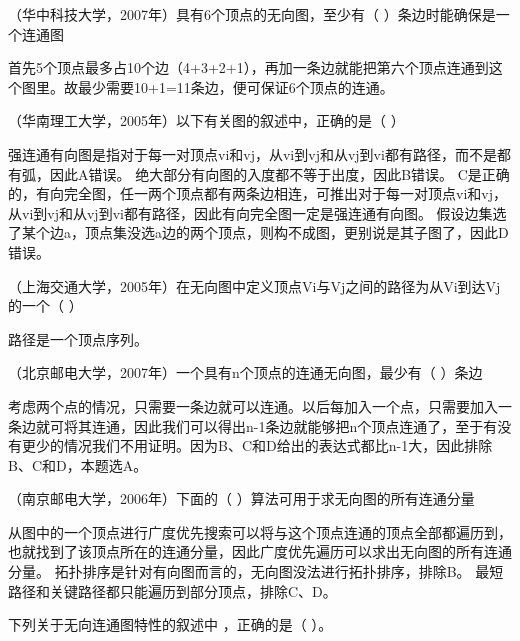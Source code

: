 \question （华中科技大学，2007年）具有6个顶点的无向图，至少有（
）条边时能确保是一个连通图
\par{}
\begin{solution}首先5个顶点最多占10个边（4+3+2+1），再加一条边就能把第六个顶点连通到这个图里。故最少需要10+1=11条边，便可保证6个顶点的连通。
\end{solution}
\question （华南理工大学，2005年）以下有关图的叙述中，正确的是（ ）
\par{}
\begin{solution}强连通有向图是指对于每一对顶点vi和vj，从vi到vj和从vj到vi都有路径，而不是都有弧，因此A错误。
绝大部分有向图的入度都不等于出度，因此B错误。
C是正确的，有向完全图，任一两个顶点都有两条边相连，可推出对于每一对顶点vi和vj，从vi到vj和从vj到vi都有路径，因此有向完全图一定是强连通有向图。
假设边集选了某个边a，顶点集没选a边的两个顶点，则构不成图，更别说是其子图了，因此D错误。
\end{solution}
\question （上海交通大学，2005年）在无向图中定义顶点Vi与Vj之间的路径为从Vi到达Vj的一个（
）
\par{}
\begin{solution}路径是一个顶点序列。
\end{solution}
\question （北京邮电大学，2007年）一个具有n个顶点的连通无向图，最少有（ ）条边
\par{}
\begin{solution}考虑两个点的情况，只需要一条边就可以连通。以后每加入一个点，只需要加入一条边就可将其连通，因此我们可以得出n-1条边就能够把n个顶点连通了，至于有没有更少的情况我们不用证明。因为B、C和D给出的表达式都比n-1大，因此排除B、C和D，本题选A。
\end{solution}
\question （南京邮电大学，2006年）下面的（ ）算法可用于求无向图的所有连通分量
\par{}
\begin{solution}从图中的一个顶点进行广度优先搜索可以将与这个顶点连通的顶点全部都遍历到，也就找到了该顶点所在的连通分量，因此广度优先遍历可以求出无向图的所有连通分量。
拓扑排序是针对有向图而言的，无向图没法进行拓扑排序，排除B。
最短路径和关键路径都只能遍历到部分顶点，排除C、D。
\end{solution}
\question 下列关于无向连通图特性的叙述中 ，正确的是（ ）。
